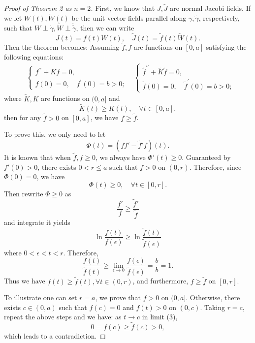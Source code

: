 \documentclass{ctexart}
\begin{document}
\begin{proof}[Proof of Theorem 2 as $n=2$]
  First, we know that $J, \widetilde{J}$ are normal Jacobi fields. If we let $W(t), \widetilde{W}(t)$ be the unit vector fields parallel
  along $\gamma, \widetilde{\gamma}$, respectively, such that $W \perp \dot{\gamma}, \widetilde{W} \perp \dot{\widetilde{\gamma}}$, then we can write
  $$
   J(t)=f(t) W(t), \quad\widetilde{J}(t)=\tilde{f}(t) \widetilde{W}(t).
  $$
  Then the theorem becomes:
  Assuming $\tilde{f}, f$ are functions on $[0, a]$ satisfying the following equations:
  $$
  \begin{aligned}
  & \left\{\begin{array}{l}
  f^{\prime \prime}+K f=0, \\
  f(0)=0, \quad f^{\prime}(0)=b>0 ;
  \end{array}\right.
  & \left\{\begin{array}{l}
    \tilde{f}^{\prime \prime}+\tilde{K} \tilde{f}=0, \\
    \tilde{f}(0)=0, \quad \tilde{f}^{\prime}(0)=b>0 ;
    \end{array}\right. 
  \end{aligned}
  $$
  where $\tilde{K}, K$ are functions on $(0, a]$ and
  $$
  \tilde{K}(t) \geq K(t), \quad \forall t \in[0, a],
  $$
  then for any $\tilde{f}>0$ on $[0, a]$, we have $f \geq \tilde{f}$. 
  
  To prove this, we only need to let 
  $$
  \Phi(t) = (ff' - \tilde{f}'f)(t).
  $$ 
  It is known that when $\tilde{f},f \geq 0$, we always have $\Phi'(t) \geq 0$. 
  Guaranteed by $f'(0)>0$, there exists $0<r\leq a$ such that $f>0$ on $(0,r)$. Therefore, since $\Phi(0)=0$, we have
  $$
  \Phi(t) \geq 0, \quad \forall t \in [0,r].
  $$
  Then rewrite $\Phi \geq 0$ as
  \begin{equation}
    \frac{f' }{f} \geq \frac{\tilde{f}'}{\tilde{f}}
  \end{equation}
  and integrate it yields
  $$
  \ln\frac{f(t)}{f(\epsilon)} \geq \ln\frac{\tilde{f}(t)}{\tilde{f}(\epsilon)}
  $$
  where $0 < \epsilon < t < r$. Therefore,
  \begin{equation}
    \frac{f(t)}{\tilde{f}(t)} \geq \lim_{\epsilon \rightarrow 0} \frac{f(\epsilon)}{\tilde{f}(\epsilon)} = \frac{b}{b} = 1.
  \end{equation}
  Thus we have $f(t) \geq \tilde{f}(t), \forall t \in (0,r)$, and furthermore, $f \geq \tilde{f}$ on $[0,r]$.

  To illustrate one can set $r=a$, we prove that $f>0$ on $(0,a]$. Otherwise, there exists $c\in (0,a)$ such that $f(c)=0$ and $f(t)>0$ on $(0,c)$. 
  Taking $r=c$, repeat the above steps and we have: as $t\rightarrow c$ in limit (3),
  $$
  0=f(c)\geq \tilde{f}(c)>0, 
  $$
  which leads to a contradiction.
\end{proof}
\end{document}
